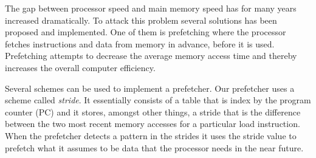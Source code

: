 The gap between processor speed and main memory speed has for many years increased dramatically. To
attack this problem several solutions has been proposed and implemented. One of them is prefetching
where the processor fetches instructions and data from memory in advance, before it is used.
Prefetching attempts to decrease the average memory access time and thereby increases the overall 
computer efficiency. 

Several schemes can be used to implement a prefetcher. Our prefetcher uses a scheme called
\emph{stride}. It essentially consists of a table that is index by the program counter (PC) and it
stores, amongst other things, a stride that is the difference between the two most recent memory
accesses for a particular load instruction. When the prefetcher detects a pattern in the
strides it uses the stride value to prefetch what it assumes to be data that the processor needs in
the near future.
